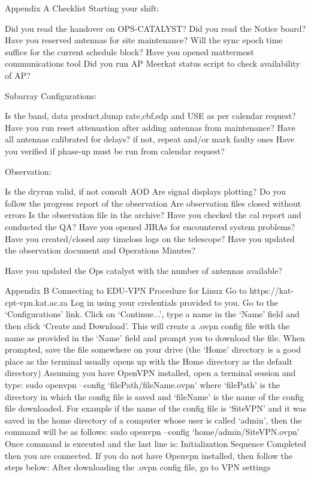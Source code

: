 
Appendix A
Checklist
Starting your shift:

Did you read the handover on OPS-CATALYST?
Did you read the Notice board?
Have you reserved antennas for site maintenance?
Will the sync epoch time suffice for the current schedule block?
Have you opened mattermost communications tool
Did you run AP Meerkat status script to check availability of AP?



Subarray Configurations:

Is the band, data product,dump rate,cbf,sdp and USE as per calendar request?
Have you run reset attenuation after adding antennas from maintenance?
Have all antennas calibrated for delays? if not, repeat and/or mark faulty ones
Have you verified if phase-up must be run from calendar request?


Observation:

Is the dryrun valid, if not consult AOD
Are signal displays plotting?
Do you follow the progress report of the observation
Are observation files closed without errors
Is the observation file in the archive?
Have you checked the cal report and conducted the QA?
Have you opened JIRAs for encountered system problems?
Have you created/closed any timeloss logs on the telescope?
Have you updated the observation document and Operations Minutes?


Have you updated the Ops catalyst with the number of antennas available?



Appendix B
Connecting to EDU-VPN
Procedure for Linux
Go to https://kat-cpt-vpn.kat.ac.za
Log in using your credentials provided to you.
Go to the ‘Configurations’ link.
Click on ‘Continue...’, type a name in the ‘Name’ field and then click ‘Create and Download’. This will create a .ovpn config file with the name as provided in the ‘Name’ field and prompt you to download the file.
When prompted, save the file somewhere on your drive (the ‘Home’ directory is a good place as the terminal usually opens up with the Home directory as the default directory)
Assuming you have OpenVPN installed, open a terminal session and type:
sudo openvpn --config ‘filePath/fileName.ovpn’
	where ‘filePath’ is the directory in which the config file is saved and ‘fileName’ is the       name of the config file downloaded. For example if the name of the config file is ‘SiteVPN’ and it was saved in the home directory of a computer whose user is called ‘admin’, then the command will be as follows:
sudo openvpn --config ‘home/admin/SiteVPN.ovpn’
Once command is executed and the last line is:
Initialization Sequence Completed
	then you are connected.
If you do not have Openvpn installed, then follow the steps below:
After downloading the .ovpn config file, go to VPN settings



